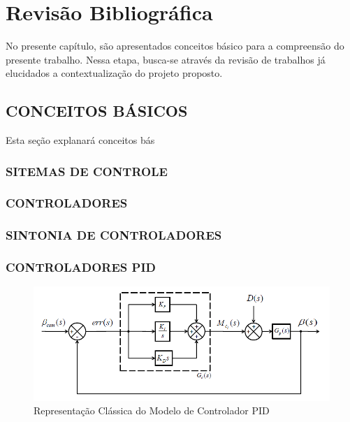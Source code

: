 \chapter{Revisão Bibliográfica}

No presente capítulo, são apresentados conceitos básico para a compreensão do presente trabalho. Nessa etapa, busca-se através da revisão de trabalhos já elucidados a contextualização do projeto proposto.

\section{CONCEITOS BÁSICOS}


Esta seção explanará conceitos bás

\subsection{SITEMAS DE CONTROLE}
 
\subsection{CONTROLADORES}

\subsection{SINTONIA DE CONTROLADORES}

\subsection{CONTROLADORES PID}

\begin{figure}[htb]
	\caption{Representação Clássica do Modelo de Controlador PID}
	\begin{center}
	    \includegraphics[scale=0.75]{img/pid_controller.PNG}
	\end{center}
\end{figure}


